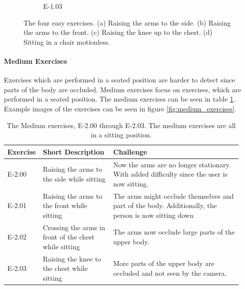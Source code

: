 \begin{figure}
\begin{subfigure}[b]{0.16\linewidth}
        \caption[]{E-1.03}
    \end{subfigure}
    \caption[Easy Exercises]{The four easy exercises. (a) Raising the arms to the side. (b) Raising the arms to the front. (c) Raising the knee up to the chest. (d) Sitting in a chair motionless.}
    \label{fig:easy_exercises}
  \end{figure}  

\paragraph{Medium Exercises}

Exercises which are performed in a seated position are harder to detect since parts of the body are occluded. Medium exercises focus on exercises, which are performed in a seated position. The medium exercises can be seen in table \ref{tab:medium_exercises}. Example images of the exercises can be seen in figure \ref{fig:medium_exercises}.

\begin{table}[]
  \caption[Medium Exercises]{The Medium exercises, E-2.00 through E-2.03. The medium exercises are all in a sitting position.}
  \label{tab:medium_exercises}
  \begin{tabular}{p{0.1\linewidth}p{0.3\linewidth}p{0.55\linewidth}}
  \hline
  Exercise & Short Description                                     & Challenge \\ \hline
  E-2.00   & Raising the arms to the side while sitting            & Now the arms are no longer stationary. With added difficulty since the user is now sitting.         \\
  E-2.01   & Raising the arms to the front while sitting           & The arms might occlude themselves and part of the body. Additionally, the person is now sitting down\\
  E-2.02   & Crossing the arms in front of the chest while sitting & The arms now occlude large parts of the upper body.                                                                                            \\
  E-2.03   & Raising the knee to the chest while sitting           & More parts of the upper body are occluded and not seen by the camera.                              \\ \hline
  \end{tabular}
  \end{table}


